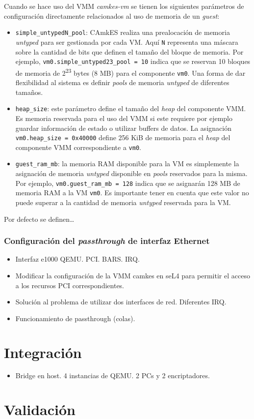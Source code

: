 Cuando se hace uso del VMM \textit{camkes-vm} se tienen los siguientes parámetros de configuración directamente relacionados al uso de memoria de un \textit{guest}:
\begin{itemize}
    \item \texttt{simple\_untypedN\_pool}: CAmkES realiza una prealocación de memoria \textit{untyped} para ser gestionada por cada VM. Aquí \texttt{N} representa una máscara sobre la cantidad de bits que definen el tamaño del bloque de memoria. Por ejemplo, \texttt{vm0.simple\_untyped23\_pool = 10} indica que se reservan 10 bloques de memoria de 2\textsuperscript{23} bytes (8 MB) para el componente \texttt{vm0}. Una forma de dar flexibilidad al sistema es definir \textit{pools} de memoria \textit{untyped} de diferentes tamaños. 
    \item \texttt{heap\_size}: este parámetro define el tamaño del \textit{heap} del componente VMM. Es memoria reservada para el uso del VMM si este requiere por ejemplo guardar información de estado o utilizar buffers de datos. La asignación \texttt{vm0.heap\_size = 0x40000} define 256 KiB de memoria para el \textit{heap} del componente VMM correspondiente a \texttt{vm0}.
    \item \texttt{guest\_ram\_mb}: la memoria RAM disponible para la VM es simplemente la asignación de memoria \textit{untyped} disponible en \textit{pools} reservados para la misma. Por ejemplo, \texttt{vm0.guest\_ram\_mb = 128} indica que se asignarán 128 MB de memoria RAM a la VM \texttt{vm0}. Es importante tener en cuenta que este valor no puede superar a la cantidad de memoria \textit{untyped} reservada para la VM.
\end{itemize}
Por defecto se definen\dots
{}


\subsubsection{Configuración del \textit{passthrough} de interfaz Ethernet}
\begin{itemize}
    \item Interfaz e1000 QEMU. PCI. BARS. IRQ.
    \item Modificar la configuración de la VMM camkes en seL4 para permitir el acceso a los recursos PCI correspondientes.
    \item Solución al problema de utilizar dos interfaces de red. Diferentes IRQ.
    \item Funcionamiento de passthrough (colas).
\end{itemize}

\section{Integración}
\begin{itemize}
    \item Bridge en host. 4 instancias de QEMU. 2 PCs y 2 encriptadores.
\end{itemize}

\section{Validación} %
